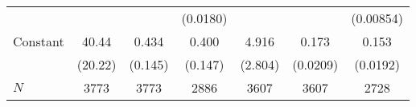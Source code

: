 {\begin{tabular}{l*{6}{c}}
            &                     &                     &    (0.0180)         &                     &                     &   (0.00854)         \\
Constant    &       40.44\sym{*}  &       0.434\sym{**} &       0.400\sym{**} &       4.916         &       0.173\sym{***}&       0.153\sym{***}\\
            &     (20.22)         &     (0.145)         &     (0.147)         &     (2.804)         &    (0.0209)         &    (0.0192)         \\
\hline
\(N\)       &        3773         &        3773         &        2886         &        3607         &        3607         &        2728         \\
\hline\hline
\end{tabular}
}
